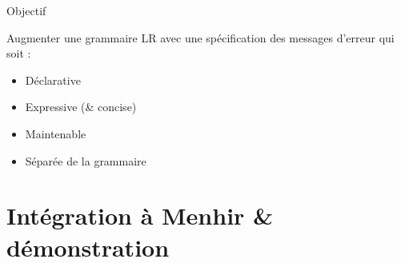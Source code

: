 \documentclass{beamer}          %
\begin{document}
\begin{frame}{Objectif}

  Augmenter une grammaire LR avec une spécification des messages d'erreur qui soit :
  \begin{itemize}
    \item Déclarative
    \item Expressive (\& concise)
    \item Maintenable
    \item Séparée de la grammaire
  \end{itemize}
\end{frame}

\section{Intégration à Menhir \& démonstration}
\end{document}

